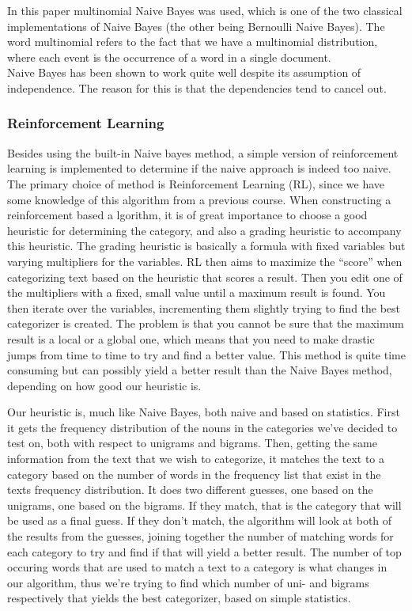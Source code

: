\documentclass[a4paper,10pt]{article}
\begin{document}
\noindent In this paper multinomial Naive Bayes was used, which is one of the two classical implementations of Naive Bayes (the other being Bernoulli Naive Bayes). The word multinomial refers to the fact that we have a multinomial distribution, where each event is the occurrence of a word in a single document.\\

\noindent Naive Bayes has been shown to work quite well despite its assumption of independence. The reason for this is that the dependencies tend to cancel out\cite{NBindependence}. 

\subsubsection{Reinforcement Learning}
Besides using the built-in Naive bayes method, a simple version of reinforcement learning is implemented to determine if the naive approach is indeed too naive. The primary choice of method is Reinforcement Learning (RL), since we have some knowledge of this algorithm from a previous course. When constructing a reinforcement based a
lgorithm, it is of great importance to choose a good heuristic for determining the category, and also a grading heuristic to accompany this heuristic. The grading heuristic is basically a formula with fixed variables but varying multipliers for the variables. RL then aims to maximize the ``score'' when categorizing text based on the heuristic that scores a result. Then you edit one of the multipliers with a fixed, small value until a maximum result is found. You then iterate over the variables, incrementing them slightly trying to find the best categorizer is created. The problem is that you cannot be sure that the maximum result is a local or a global one, which means that you need to make drastic jumps from time to time to try and find a better value. This method is quite time consuming but can possibly yield a better result than the Naive Bayes method, depending on how good our heuristic is.

Our heuristic is, much like Naive Bayes, both naive and based on statistics. First it gets the frequency distribution of the nouns in the categories we've decided to test on, both with respect to unigrams and bigrams. Then, getting the same information from the text that we wish to categorize, it matches the text to a category based on the number of words in the frequency list that exist in the texts frequency distribution. It does two different guesses, one based on the unigrams, one based on the bigrams. If they match, that is the category that will be used as a final guess. If they don't match, the algorithm will look at both of the results from the guesses, joining together the number of matching words for each category to try and find if that will yield a better result. The number of top occuring words that are used to match a text to a category is what changes in our algorithm, thus we're trying to find which number of uni- and bigrams respectively that yields the best categorizer, based on simple statistics.
\end{document}
